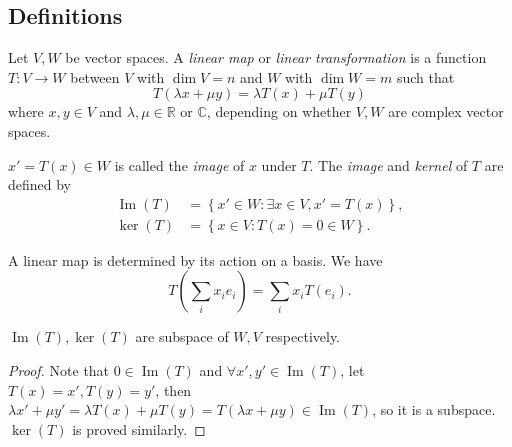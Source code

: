 \documentclass[10pt]{article}
\DeclareMathOperator{\im}{Im}
\begin{document}
    \subsection{Definitions}
    \begin{definition}
        Let $ V,W $ be vector spaces. A \textit{linear map} or \textit{linear transformation} is a function $ T:V\to W $ between $V$ with $\dim V=n$ and $W$ with $\dim W=m$ such that 
        \[
            T(\lambda x+ \mu y)=\lambda T(x)+\mu T(y)
        \]
        where $ x,y\in V $ and $ \lambda,\mu\in \mathbb{R}$ or $ \mathbb{C} $, depending on whether $V,W$ are complex vector spaces.

        $ x'=T(x)\in W $ is called the \textit{image} of $x$ under $T$. The \textit{image} and \textit{kernel} of $T$ are defined by
        \[
            \begin{aligned}
                 \im(T)&=\left\{ x'\in W: \exists x\in V, x'=T(x)\right\},\\
                \ker(T)&=\left\{ x\in V:T(x)=0\in W\right\}.
            \end{aligned}    
        \]
    \end{definition}
    \begin{remark}
        A linear map is determined by its action on a basis. We have 
        \[
            T\left( \sum_{i}x_i e_i \right)=\sum_{i}x_i T(e_i)
        .\]
    \end{remark}
    \begin{lemma}\label{lma:ker,im subspace}
        $ \im(T),\ker(T) $ are subspace of $ W,V $ respectively.
    \end{lemma}
    \begin{proof}
        Note that $ 0\in \im(T) $ and $ \forall x',y'\in\im(T)  $, let $ T(x)=x',T(y)=y' $, then $  \lambda x'+\mu y'=\lambda T(x)+\mu T(y)=T(\lambda x+\mu y)\in \im(T) $, so it is a subspace. $\ker(T)$ is proved similarly.
    \end{proof}
\end{document}
